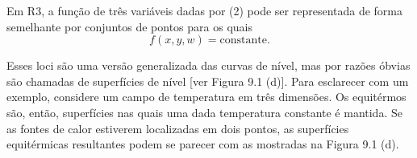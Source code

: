 Em R3, a função de três variáveis dadas por (2) pode ser representada de forma semelhante por conjuntos de pontos para os quais
\begin{equation}\label{eq:09.04}
f(x, y, w) = \mathrm{constante}.
\end{equation}

Esses loci são uma versão generalizada das curvas de nível, mas por razões óbvias são chamadas de superfícies de nível [ver Figura 9.1 (d)]. Para esclarecer com um exemplo, considere um campo de temperatura em três dimensões. Os equitérmos são, então, superfícies nas quais uma dada temperatura constante é mantida. Se as fontes de calor estiverem localizadas em dois pontos, as superfícies equitérmicas resultantes podem se parecer com as mostradas na Figura 9.1 (d).


